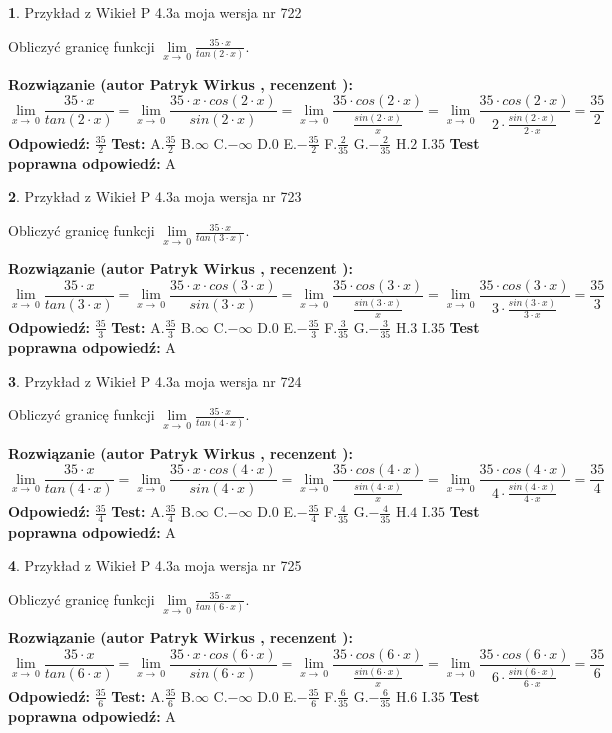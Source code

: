 \documentclass[12pt, a4paper]{article}
\theoremstyle{definition} %
\newtheorem{zad}{}
\newcommand{\zadStart}[1]{\begin{zad}#1\newline}
\newcommand{\zadStop}{\end{zad}}
\newcommand{\rozwStart}[2]{\noindent \textbf{Rozwiązanie (autor #1 , recenzent #2): }\newline}
\newcommand{\rozwStop}{\newline}
\newcommand{\odpStart}{\noindent \textbf{Odpowiedź:}\newline}
\newcommand{\odpStop}{\newline}
\newcommand{\testStart}{\noindent \textbf{Test:}\newline}
\newcommand{\testStop}{\newline}
\newcommand{\kluczStart}{\noindent \textbf{Test poprawna odpowiedź:}\newline}
\newcommand{\kluczStop}{\newline}
\begin{document}
\zadStart{Przykład z Wikieł P 4.3a moja wersja nr 722}


Obliczyć granicę funkcji $\lim\limits_{x\to\ 0}\frac{35 \cdot x}{tan(2 \cdot x)}$.
\zadStop
\rozwStart{Patryk Wirkus}{}
$$\lim\limits_{x\to\ 0}\frac{35 \cdot x}{tan(2 \cdot x)}=\lim\limits_{x\to\ 0}\frac{35 \cdot x \cdot cos(2 \cdot x)}{sin(2 \cdot x)}=\lim\limits_{x\to\ 0}\frac{35 \cdot cos(2 \cdot x)}{\frac{sin(2 \cdot x)}{x}}=\lim\limits_{x\to\ 0}\frac{35 \cdot cos(2 \cdot x)}{2 \cdot \frac{sin(2 \cdot x)}{2 \cdot x}} = \frac{35}{2}$$
\rozwStop
\odpStart
$\frac{35}{2}$
\odpStop
\testStart
A.$\frac{35}{2}$
B.$\infty$
C.$-\infty$
D.$0$
E.$-\frac{35}{2}$
F.$\frac{2}{35}$
G.$-\frac{2}{35}$
H.$2$
I.$35$
\testStop
\kluczStart
A
\kluczStop



\zadStart{Przykład z Wikieł P 4.3a moja wersja nr 723}


Obliczyć granicę funkcji $\lim\limits_{x\to\ 0}\frac{35 \cdot x}{tan(3 \cdot x)}$.
\zadStop
\rozwStart{Patryk Wirkus}{}
$$\lim\limits_{x\to\ 0}\frac{35 \cdot x}{tan(3 \cdot x)}=\lim\limits_{x\to\ 0}\frac{35 \cdot x \cdot cos(3 \cdot x)}{sin(3 \cdot x)}=\lim\limits_{x\to\ 0}\frac{35 \cdot cos(3 \cdot x)}{\frac{sin(3 \cdot x)}{x}}=\lim\limits_{x\to\ 0}\frac{35 \cdot cos(3 \cdot x)}{3 \cdot \frac{sin(3 \cdot x)}{3 \cdot x}} = \frac{35}{3}$$
\rozwStop
\odpStart
$\frac{35}{3}$
\odpStop
\testStart
A.$\frac{35}{3}$
B.$\infty$
C.$-\infty$
D.$0$
E.$-\frac{35}{3}$
F.$\frac{3}{35}$
G.$-\frac{3}{35}$
H.$3$
I.$35$
\testStop
\kluczStart
A
\kluczStop



\zadStart{Przykład z Wikieł P 4.3a moja wersja nr 724}


Obliczyć granicę funkcji $\lim\limits_{x\to\ 0}\frac{35 \cdot x}{tan(4 \cdot x)}$.
\zadStop
\rozwStart{Patryk Wirkus}{}
$$\lim\limits_{x\to\ 0}\frac{35 \cdot x}{tan(4 \cdot x)}=\lim\limits_{x\to\ 0}\frac{35 \cdot x \cdot cos(4 \cdot x)}{sin(4 \cdot x)}=\lim\limits_{x\to\ 0}\frac{35 \cdot cos(4 \cdot x)}{\frac{sin(4 \cdot x)}{x}}=\lim\limits_{x\to\ 0}\frac{35 \cdot cos(4 \cdot x)}{4 \cdot \frac{sin(4 \cdot x)}{4 \cdot x}} = \frac{35}{4}$$
\rozwStop
\odpStart
$\frac{35}{4}$
\odpStop
\testStart
A.$\frac{35}{4}$
B.$\infty$
C.$-\infty$
D.$0$
E.$-\frac{35}{4}$
F.$\frac{4}{35}$
G.$-\frac{4}{35}$
H.$4$
I.$35$
\testStop
\kluczStart
A
\kluczStop



\zadStart{Przykład z Wikieł P 4.3a moja wersja nr 725}


Obliczyć granicę funkcji $\lim\limits_{x\to\ 0}\frac{35 \cdot x}{tan(6 \cdot x)}$.
\zadStop
\rozwStart{Patryk Wirkus}{}
$$\lim\limits_{x\to\ 0}\frac{35 \cdot x}{tan(6 \cdot x)}=\lim\limits_{x\to\ 0}\frac{35 \cdot x \cdot cos(6 \cdot x)}{sin(6 \cdot x)}=\lim\limits_{x\to\ 0}\frac{35 \cdot cos(6 \cdot x)}{\frac{sin(6 \cdot x)}{x}}=\lim\limits_{x\to\ 0}\frac{35 \cdot cos(6 \cdot x)}{6 \cdot \frac{sin(6 \cdot x)}{6 \cdot x}} = \frac{35}{6}$$
\rozwStop
\odpStart
$\frac{35}{6}$
\odpStop
\testStart
A.$\frac{35}{6}$
B.$\infty$
C.$-\infty$
D.$0$
E.$-\frac{35}{6}$
F.$\frac{6}{35}$
G.$-\frac{6}{35}$
H.$6$
I.$35$
\testStop
\kluczStart
A
\kluczStop
\end{document}
